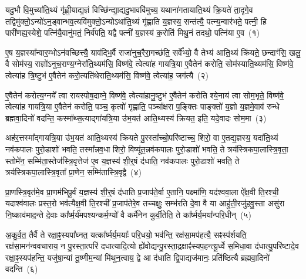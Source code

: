 \setcounter{anuvakam}{0}
यदु॒भौ वि॒मुच्या॑ति॒थ्यं गृ॑ह्णी॒याद्य॒ज्ञं विच्छि॑न्द्या॒द्यदु॒भाववि॑मुच्य॒ यथाना॑गतायाति॒थ्यं क्रि॒यते॑ ता॒दृगे॒व तद्विमु॑क्तो॒\-ऽन्यो॑\-ऽन॒ड्वान्भव॒त्यवि॑मुक्तो॒\-ऽन्यो\-ऽथा॑ति॒थ्यं गृ॑ह्णाति य॒ज्ञस्य॒ सन्त॑त्यै॒ पत्न्य॒न्वार॑भते॒ पत्नी॒ हि पारी॑णह्य॒स्येशे॒ पत्नि॑यै॒वानु॑मतं॒ निर्व॑पति॒ यद्वै पत्नी॑ य॒ज्ञस्य॑ क॒रोति॑ मिथु॒नं तदथो॒ पत्नि॑या ए॒व~(१)

ए॒ष य॒ज्ञस्या᳚न्वार॒म्भो\-ऽन॑वच्छित्त्यै॒ याव॑द्भि॒र्वै राजा॑नुच॒रैरा॒गच्छ॑ति॒ सर्वे᳚भ्यो॒ वै तेभ्य॑ आति॒थ्यं क्रि॑यते॒ छन्दाꣳ॑सि॒ खलु॒ वै सोम॑स्य॒ राज्ञो॑\-ऽनुच॒राण्य॒ग्नेरा॑ति॒थ्यम॑सि॒ विष्ण॑वे॒ त्वेत्या॑ह गायत्रि॒या ए॒वैतेन॑ करोति॒ सोम॑स्याति॒थ्यम॑सि॒ विष्ण॑वे॒ त्वेत्या॑ह त्रि॒ष्टुभ॑ ए॒वैतेन॑ करो॒त्यति॑थेराति॒थ्यम॑सि॒ विष्ण॑वे॒ त्वेत्या॑ह॒ जग॑त्यै~(२)

ए॒वैतेन॑ करोत्य॒ग्नये᳚ त्वा रायस्पोष॒दाव्ने॒ विष्ण॑वे॒ त्वेत्या॑हानु॒ष्टुभ॑ ए॒वैतेन॑ करोति श्ये॒नाय॑ त्वा सोम॒भृते॒ विष्ण॑वे॒ त्वेत्या॑ह गायत्रि॒या ए॒वैतेन॑ करोति॒ पञ्च॒ कृत्वो॑ गृह्णाति॒ पञ्चा᳚क्षरा प॒ङ्क्तिः पाङ्क्तो॑ य॒ज्ञो य॒ज्ञमे॒वाव॑ रुन्धे ब्रह्मवा॒दिनो॑ वदन्ति॒ कस्मा᳚थ्स॒त्याद्गा॑यत्रि॒या उ॑भ॒यत॑ आति॒थ्यस्य॑ क्रियत॒ इति॒ यदे॒वादः सोम॒मा~(३)

अह॑र॒त्तस्मा᳚द्गायत्रि॒या उ॑भ॒यत॑ आति॒थ्यस्य॑ क्रियते पु॒रस्ता᳚च्चो॒परि॑ष्टाच्च॒ शिरो॒ वा ए॒तद्य॒ज्ञस्य॒ यदा॑ति॒थ्यं नव॑कपालः पुरो॒डाशो॑ भवति॒ तस्मा᳚न्नव॒धा शिरो॒ विष्यू॑त॒न्नव॑कपालः पुरो॒डाशो॑ भवति॒ ते त्रय॑स्त्रिकपा॒लास्त्रि॒वृता॒ स्तोमे॑न॒ सम्मि॑ता॒स्तेज॑स्त्रि॒वृत्तेज॑ ए॒व य॒ज्ञस्य॑ शी॒र्॒\mbox{}षं द॑धाति॒ नव॑कपालः पुरो॒डाशो॑ भवति॒ ते त्रय॑स्त्रिकपा॒लास्त्रि॒वृता᳚ प्रा॒णेन॒ सम्मि॑तास्त्रि॒वृद्वै~(४)

प्रा॒णस्त्रि॒वृत॑मे॒व प्रा॒णम॑भिपू॒र्वं य॒ज्ञस्य॑ शी॒र्॒\mbox{}षं द॑धाति प्र॒जा\-प॑ते॒र्वा ए॒तानि॒ पक्ष्मा॑णि॒ यद॑श्ववा॒ला ऐ᳚क्ष॒वी ति॒रश्ची॒ यदाश्व॑वालः प्रस्त॒रो भव॑त्यैक्ष॒वी ति॒रश्ची᳚ प्र॒जा\-प॑तेरे॒व तच्चक्षुः॒ सम्भ॑रति दे॒वा वै या आहु॑ती॒रजु॑हवु॒स्ता असु॑रा नि॒ष्काव॑माद॒न्ते दे॒वाः का᳚र्\mbox{}ष्म॒र्य॑मपश्यन्कर्म॒ण्यो॑ वै कर्मै॑नेन कुर्वी॒तेति॒ ते का᳚र्ष्मर्य॒मया᳚न्परि॒धीन्~(५)

अ॒कु॒र्व॒त॒ तैर्वै ते रक्षा॒ꣴ॒स्यपा᳚घ्नत॒ यत्का᳚र्ष्मर्य॒मयाः᳚ परि॒धयो॒ भव॑न्ति॒ रक्ष॑सा॒मप॑हत्यै॒ सꣴस्प॑र्\mbox{}शयति॒ रक्ष॑सा॒मन॑न्ववचाराय॒ न पु॒रस्ता॒त्परि॑ दधात्यादि॒त्यो ह्ये॑वोद्यन्पु॒रस्ता॒द्रक्षाꣴ॑स्यप॒हन्त्यू॒र्ध्वे स॒मिधा॒वा द॑धात्यु॒परि॑ष्टादे॒व रक्षा॒ꣴ॒स्यप॑हन्ति॒ यजु॑षा॒न्यां तू॒ष्णीम॒न्यां मि॑थुन॒त्वाय॒ द्वे आ द॑धाति द्वि॒पाद्यज॑मानः॒ प्रति॑ष्ठित्यै ब्रह्मवा॒दिनो॑ वदन्ति~(६)

